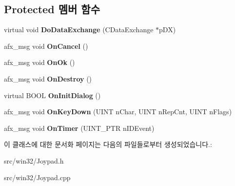 \subsection*{Protected 멤버 함수}
\begin{DoxyCompactItemize}
\item 
\mbox{\label{class_motion_config_a1f27a900666b5c804f255f39b32d5dfd}} 
virtual void {\bfseries Do\+Data\+Exchange} (C\+Data\+Exchange $\ast$p\+DX)
\item 
\mbox{\label{class_motion_config_a3b2f649ce95dfb9f6b1efb8c7d8c9213}} 
afx\+\_\+msg void {\bfseries On\+Cancel} ()
\item 
\mbox{\label{class_motion_config_a252355cb318ff1f62c63d89941b2758e}} 
afx\+\_\+msg void {\bfseries On\+Ok} ()
\item 
\mbox{\label{class_motion_config_a45547ed24ce1f7fdabd5754ec526d0a9}} 
afx\+\_\+msg void {\bfseries On\+Destroy} ()
\item 
\mbox{\label{class_motion_config_ac1e282a94d14b433764eeae95b4cab6b}} 
virtual B\+O\+OL {\bfseries On\+Init\+Dialog} ()
\item 
\mbox{\label{class_motion_config_a210354b3272911c9ed7507c7262243f1}} 
afx\+\_\+msg void {\bfseries On\+Key\+Down} (U\+I\+NT n\+Char, U\+I\+NT n\+Rep\+Cnt, U\+I\+NT n\+Flags)
\item 
\mbox{\label{class_motion_config_ac787a62c63e00f55582bb4695bbd04d6}} 
afx\+\_\+msg void {\bfseries On\+Timer} (U\+I\+N\+T\+\_\+\+P\+TR n\+I\+D\+Event)
\end{DoxyCompactItemize}


이 클래스에 대한 문서화 페이지는 다음의 파일들로부터 생성되었습니다.\+:\begin{DoxyCompactItemize}
\item 
src/win32/Joypad.\+h\item 
src/win32/Joypad.\+cpp\end{DoxyCompactItemize}
